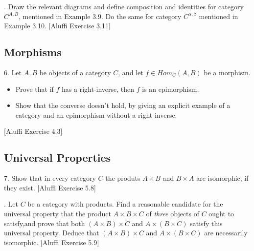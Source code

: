 \documentclass{article}
\begin{document}
\vspace{2.5mm}
. Draw the relevant diagrams and define composition and identities for category $C^{A,B}$, mentioned in Example 3.9. Do the same for category $C^{\alpha,\beta}$ mentioned in Example 3.10. [Aluffi Exercise 3.11]

\subsection{Morphisms}
6. Let $A,B$ be objects of a category $C$, and let $f \in Hom_{C}(A,B)$ be a morphism. 
\begin{itemize}
\item Prove that if $f$ has a right-inverse, then $f$ is an epimorphism. 
\item Show that the converse doesn't hold, by giving an explicit example of a category and an epimorphism without a right inverse. 
\end{itemize}

[Aluffi Exercise 4.3]
\subsection{Universal Properties}
7. Show that in every category $C$ the produts $A \times B$ and $ B \times A$ are isomorphic, if they exist. [Aluffi Exercise 5.8]

\vspace{2.5mm}
. Let $C$ be a category with products. Find a reasonable candidate for the universal property that the product $A \times B \times C$ of \textit{three} objects of $C$ ought to satisfy,and prove that both $(A \times B) \times C$ and $A \times (B \times C)$ satisfy this universal property. Deduce that $(A \times B) \times C$ and $A \times (B \times C)$ are necessarily isomorphic. [Aluffi Exercise 5.9]
\end{document}
